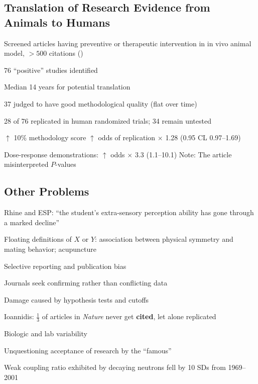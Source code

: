 \subsection{Translation of Research Evidence from Animals to Humans}
\bi
\item Screened articles having preventive or therapeutic intervention
  in in vivo animal model, $> 500$ citations (\citet{hac06tra}) 
\item 76 ``positive'' studies identified
\item Median 14 years for potential translation
\item 37 judged to have good methodological quality (flat over time)
\item 28 of 76 replicated in human randomized trials; 34 remain untested
\item $\uparrow$ 10\% methodology score $\uparrow$ odds of
replication $\times$ 1.28 (0.95 CL 0.97--1.69)
\item Dose-response demonstrations: $\uparrow$ odds $\times$ 3.3 (1.1--10.1)
\ei
Note: The article misinterpreted $P$-values

\subsection{Other Problems}
\bi
\item Rhine and ESP: ``the student's extra-sensory perception ability
has gone through a marked decline''
\item Floating definitions of $X$ or $Y$: association between physical
  symmetry and mating behavior; acupuncture
\item Selective reporting and publication bias
\item Journals seek confirming rather than conflicting data
\item Damage caused by hypothesis tests and cutoffs
\item Ioannidis: $\frac{1}{3}$ of articles in \emph{Nature} never get
  \textbf{cited}, let alone replicated 
\item Biologic and lab variability
\item Unquestioning acceptance of research by the ``famous''
  \bi
  \item Weak coupling ratio exhibited by decaying neutrons fell by 10
    SDs from 1969--2001
  \ei
\ei

